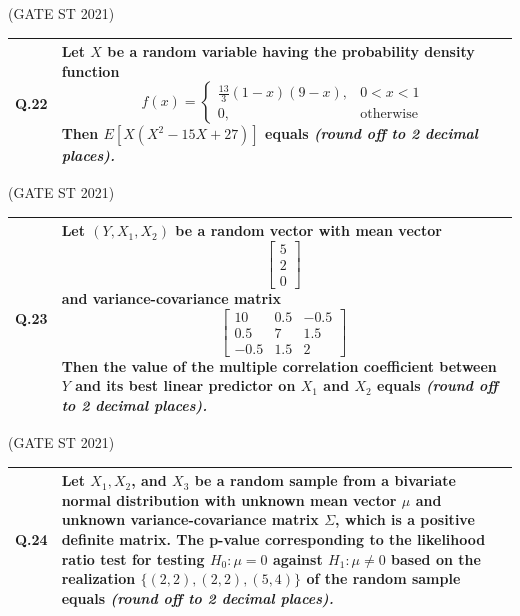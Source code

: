 \documentclass[journal,12pt,onecolumn]{IEEEtran}
\theoremstyle{remark}
\begin{document}
\bigskip
\hfill (GATE ST 2021)
\\
\begin{tabular}{|p{1cm}|p{14cm}|}
\hline
\textbf{Q.22} &
Let $X$ be a random variable having the probability density function
$$
f(x) = 
\begin{cases}
\frac{13}{3}(1-x)(9-x), & 0 < x < 1\\
0, & \text{otherwise}
\end{cases}
$$
Then $E[X(X^2 - 15X + 27)]$ equals \textit{(round off to 2 decimal places).}\\
\hline
\end{tabular}

\bigskip
\hfill (GATE ST 2021)
\\
\begin{tabular}{|p{1cm}|p{14cm}|}
\hline
\textbf{Q.23} &
Let $(Y, X_1, X_2)$ be a random vector with mean vector
$$
\begin{bmatrix}
5 \\ 2 \\ 0
\end{bmatrix}
$$
and variance-covariance matrix
$$
\begin{bmatrix}
10 & 0.5 & -0.5 \\
0.5 & 7 & 1.5 \\
-0.5 & 1.5 & 2
\end{bmatrix}
$$
Then the value of the multiple correlation coefficient between $Y$ and its best linear predictor on $X_1$ and $X_2$ equals \textit{(round off to 2 decimal places).}\\
\hline
\end{tabular}

\bigskip
\hfill (GATE ST 2021)
\\
\begin{tabular}{|p{1cm}|p{14cm}|}
\hline
\textbf{Q.24} &
Let $X_1, X_2$, and $X_3$ be a random sample from a bivariate normal distribution with unknown mean vector $\mu$ and unknown variance-covariance matrix $\Sigma$, which is a positive definite matrix. The p-value corresponding to the likelihood ratio test for testing $H_0: \mu = 0$ against $H_1: \mu \neq 0$ based on the realization $\{(2,2), (2,2), (5,4)\}$ of the random sample equals \textit{(round off to 2 decimal places).}\\
\hline
\end{tabular}
\end{document}
